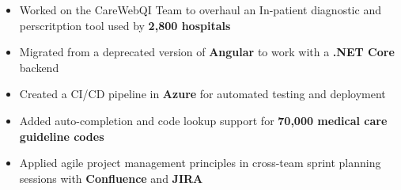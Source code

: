 \begin{itemize}
    \item Worked on the CareWebQI Team to overhaul an In-patient diagnostic and perscritption tool used by \textbf{2,800 hospitals}
    \item Migrated from a deprecated version of \textbf{Angular} to work with a \textbf{.NET Core} backend
    \item Created a CI/CD pipeline in \textbf{Azure} for automated testing and deployment
    \item Added auto-completion and code lookup support for \textbf{70,000 medical care guideline codes}
    \item Applied agile project management principles in cross-team sprint planning sessions with \textbf{Confluence} and \textbf{JIRA}
\end{itemize}
